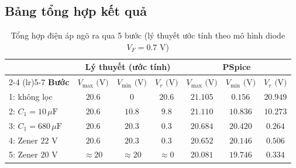 \subsection{Bảng tổng hợp kết quả}
\begin{table}[H]
  \centering
  \caption{Tổng hợp điện áp ngõ ra qua 5 bước (lý thuyết ước tính theo mô hình diode $V_F = 0.7\text{ V}$)}
  \begin{tabular}{lcccccc}
    \toprule
    & \multicolumn{3}{c}{\textbf{Lý thuyết (ước tính)}} & \multicolumn{3}{c}{\textbf{PSpice}} \\
    \cmidrule(lr){2-4} \cmidrule(lr){5-7}
    \textbf{Bước} & $V_{\max}\text{ (V)}$ & $V_{\min}\text{ (V)}$ & $V_r\text{ (V)}$ & $V_{\max}\text{ (V)}$ & $V_{\min}\text{ (V)}$ & $V_r\text{ (V)}$ \\
    \midrule
    1: không lọc               & $20.6$ & $0$    & $20.6$   & $21.105$ & $0.156$  & $20.949$ \\
    2: $C_1 = 10\,\mu\text{F}$ & $20.6$ & $10.8$ & $9.8$    & $21.110$ & $10.836$ & $10.273$ \\
    3: $C_1 = 680\,\mu\text{F}$& $20.6$ & $20.3$ & $0.3$    & $20.684$ & $20.420$ & $0.264$ \\
    4: Zener $22\text{ V}$     & $20.6$ & $20.3$ & $0.3$    & $20.652$ & $20.146$ & $0.506$ \\
    5: Zener $20\text{ V}$     & $\approx 20$ & $\approx 20$ & $\approx 0$ & $20.081$ & $19.746$ & $0.334$ \\
    \bottomrule
  \end{tabular}
\end{table}
